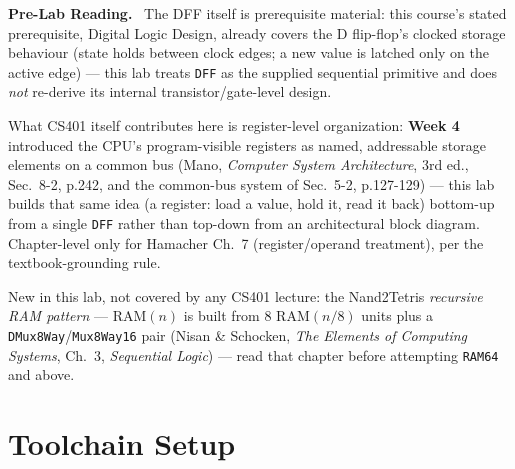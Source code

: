\documentclass[11pt]{article}
\newenvironment{tocitebox}{%
  \par\noindent\textbf{\textcolor{primary-gold}{Pre-Lab Reading.}}\
}{\par\vspace{0.3em}}
\begin{document}
\begin{tocitebox}
The DFF itself is prerequisite material: this course's stated prerequisite, Digital Logic Design, already covers the D flip-flop's clocked storage behaviour (state holds between clock edges; a new value is latched only on the active edge) --- this lab treats \texttt{DFF} as the supplied sequential primitive and does \emph{not} re-derive its internal transistor/gate-level design.

\smallskip
\noindent What CS401 itself contributes here is register-level organization: \textbf{Week 4} introduced the CPU's program-visible registers as named, addressable storage elements on a common bus (Mano, \emph{Computer System Architecture}, 3rd ed., Sec.~8-2, p.242, and the common-bus system of Sec.~5-2, p.127-129) --- this lab builds that same idea (a register: load a value, hold it, read it back) bottom-up from a single \texttt{DFF} rather than top-down from an architectural block diagram. Chapter-level only for Hamacher Ch.~7 (register/operand treatment), per the textbook-grounding rule.

\smallskip
\noindent New in this lab, not covered by any CS401 lecture: the Nand2Tetris \emph{recursive RAM pattern} --- $\mathrm{RAM}(n)$ is built from 8 $\mathrm{RAM}(n/8)$ units plus a \texttt{DMux8Way}/\texttt{Mux8Way16} pair (Nisan \& Schocken, \emph{The Elements of Computing Systems}, Ch.~3, \emph{Sequential Logic}) --- read that chapter before attempting \texttt{RAM64} and above.
\end{tocitebox}

\section{Toolchain Setup}
\end{document}
